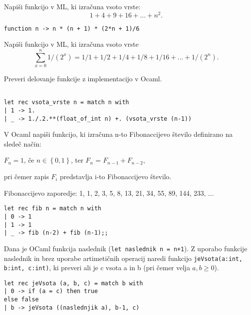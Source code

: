 \begin{ex}
Napi\v si funkcijo v ML, ki izra\v cuna vsoto vrste: 
$$1+4+9+16+...+n^2.$$

\begin{sol}
\begin{lstlisting}
function n -> n * (n + 1) * (2*n + 1)/6
\end{lstlisting}
\end{sol}

\end{ex}
\begin{ex}
Napi\v si funkcijo v ML, ki izra\v cuna vsoto vrste 
$$\sum_{x=0}^n 1/(2^x) = 1/1+1/2+1/4+1/8+1/16+...+1/(2^n).$$

Preveri delovanje funkcije z implementacijo v Ocaml.
\begin{sol}
\begin{lstlisting}
    
let rec vsota_vrste n = match n with
| 1 -> 1.
| _ -> 1./.2.**(float_of_int n) +. (vsota_vrste (n-1))
\end{lstlisting}
\end{sol}
\end{ex}
\begin{ex}
V Ocaml napi\v si funkcijo, ki izra\v cuna n-to Fibonaccijevo \v stevilo definirano na slede\v c na\v cin:
\begin{center}
$F_n = 1$, \v ce $n\in \left\{ 0,1\right\}$, ter 
$F_n$ = $F_{n-1} + F_{n-2}$, 
\end{center}
pri \v cemer zapis $F_i$ predstavlja i-to Fibonaccijevo \v stevilo. 

Fibonaccijevo zaporedje: 1, 1, 2, 3, 5, 8, 13, 21, 34, 55, 89, 144, 233, ...

\begin{sol}
\begin{lstlisting}
let rec fib n = match n with
| 0 -> 1
| 1 -> 1
| _ -> fib (n-2) + fib (n-1);;
\end{lstlisting}
\end{sol}



\end{ex}
\begin{ex}
Dana je OCaml funkcija naslednik (\lstinline{let naslednik n = n+1}). Z uporabo funkcije naslednik in brez uporabe artimeti\v cnih operacij naredi funkcijo \lstinline{jeVsota(a:int, b:int, c:int)}, ki preveri ali je c vsota a in b (pri \v cemer velja $a,b\geq 0$).


\begin{sol}
\begin{lstlisting}
let rec jeVsota (a, b, c) = match b with
| 0 -> if (a = c) then true
else false
| b -> jeVsota ((naslednjik a), b-1, c)
\end{lstlisting}
\end{sol}



\end{ex}
